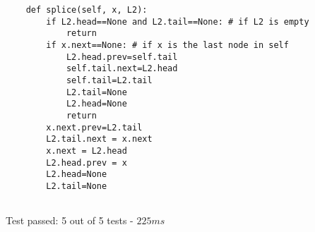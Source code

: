 \begin{problems}
\begin{problemparts}
\begin{lstlisting}
    def splice(self, x, L2):
        if L2.head==None and L2.tail==None: # if L2 is empty
            return
        if x.next==None: # if x is the last node in self
            L2.head.prev=self.tail
            self.tail.next=L2.head
            self.tail=L2.tail
            L2.tail=None
            L2.head=None
            return
        x.next.prev=L2.tail
        L2.tail.next = x.next
        x.next = L2.head
        L2.head.prev = x
        L2.head=None
        L2.tail=None


\end{lstlisting}
Test passed: 5 out of 5 tests - $225ms$
\end{problemparts}

\end{problems}


